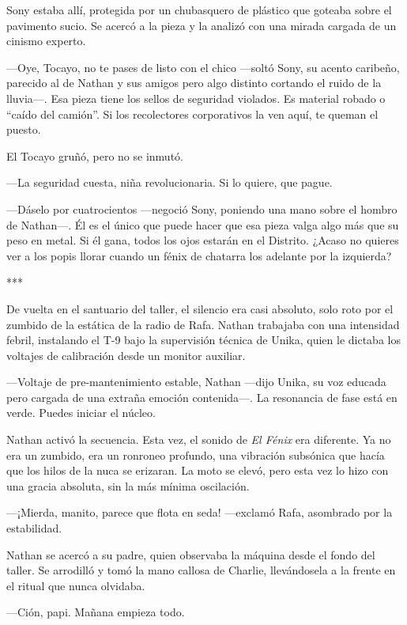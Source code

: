 \documentclass[11pt,twoside]{book}
\begin{document}
Sony estaba allí, protegida por un chubasquero de plástico que goteaba sobre el pavimento sucio. Se acercó a la pieza y la analizó con una mirada cargada de un cinismo experto.

---Oye, Tocayo, no te pases de listo con el chico ---soltó Sony, su acento caribeño, parecido al de Nathan y sus amigos pero algo distinto cortando el ruido de la lluvia---. Esa pieza tiene los sellos de seguridad violados. Es material robado o ``caído del camión''. Si los recolectores corporativos la ven aquí, te queman el puesto.

El Tocayo gruñó, pero no se inmutó.

---La seguridad cuesta, niña revolucionaria. Si lo quiere, que pague.

---Dáselo por cuatrocientos ---negoció Sony, poniendo una mano sobre el hombro de Nathan---. Él es el único que puede hacer que esa pieza valga algo más que su peso en metal. Si él gana, todos los ojos estarán en el Distrito. ¿Acaso no quieres ver a los popis llorar cuando un fénix de chatarra los adelante por la izquierda?

\bigskip
\begin{center}***\end{center}
\bigskip

De vuelta en el santuario del taller, el silencio era casi absoluto, solo roto por el zumbido de la estática de la radio de Rafa. Nathan trabajaba con una intensidad febril, instalando el T-9 bajo la supervisión técnica de Unika, quien le dictaba los voltajes de calibración desde un monitor auxiliar.

---Voltaje de pre-mantenimiento estable, Nathan ---dijo Unika, su voz educada pero cargada de una extraña emoción contenida---. La resonancia de fase está en verde. Puedes iniciar el núcleo.

Nathan activó la secuencia. Esta vez, el sonido de \textit{El Fénix} era diferente. Ya no era un zumbido, era un ronroneo profundo, una vibración subsónica que hacía que los hilos de la nuca se erizaran. La moto se elevó, pero esta vez lo hizo con una gracia absoluta, sin la más mínima oscilación.

---¡Mierda, manito, parece que flota en seda! ---exclamó Rafa, asombrado por la estabilidad.

Nathan se acercó a su padre, quien observaba la máquina desde el fondo del taller. Se arrodilló y tomó la mano callosa de Charlie, llevándosela a la frente en el ritual que nunca olvidaba.

---Ción, papi. Mañana empieza todo.
\end{document}
